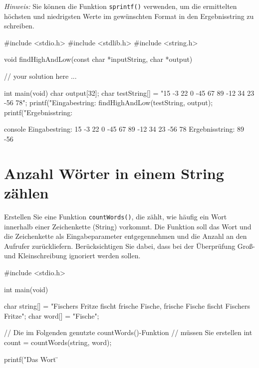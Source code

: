 \textit{Hinweis:} Sie können die Funktion \texttt{sprintf()} verwenden,
um die ermittelten höchsten und niedrigsten Werte im gewünschten Format in den
Ergebnisstring zu schreiben.

\Vorlage
\begin{codebox}[lang=c, fontsize=\small]
#include <stdio.h>
#include <stdlib.h>
#include <string.h>

void findHighAndLow(const char *inputString, char *output) {

// your solution here ...

}

int main(void) {
    char output[32];
    char testString[] = "15 -3 22 0 -45 67 89 -12 34 23 -56 78";
    printf("Eingabestring:  %
    findHighAndLow(testString, output);
    printf("Ergebnisstring: %
}
\end{codebox}

\begin{mybox}[title=Bildschirmausgabe]{console}
Eingabestring:  15 -3 22 0 -45 67 89 -12 34 23 -56 78
Ergebnisstring: 89 -56
\end{mybox}




\chapter{Anzahl Wörter in einem String zählen}

\vspace{10pt}

Erstellen Sie eine Funktion \texttt{countWords()}, die zählt, wie häufig
ein Wort innerhalb einer Zeichenkette (String) vorkommt. Die Funktion soll das
Wort und die Zeichenkette als Eingabeparameter entgegennehmen und die Anzahl an
den Aufrufer zurückliefern. Berücksichtigen Sie dabei, dass bei der Überprüfung
Groß- und Kleinschreibung ignoriert werden sollen.

\Vorlage
\begin{codebox}[lang=c, fontsize=\small]
#include <stdio.h>

int main(void) {
    char string[] = "Fischers Fritze fischt frische Fische, frische Fische fischt Fischers Fritze";
    char word[] = "Fische";

    // Die im Folgenden genutzte countWords()-Funktion
    // müssen Sie erstellen
    int count = countWords(string, word);

    printf("Das Wort \"%
}
\end{codebox}

